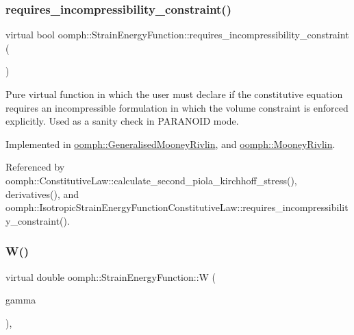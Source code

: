 \subsubsection{\texorpdfstring{requires\+\_\+incompressibility\+\_\+constraint()}{requires\_incompressibility\_constraint()}}
{\footnotesize\ttfamily virtual bool oomph\+::\+Strain\+Energy\+Function\+::requires\+\_\+incompressibility\+\_\+constraint (\begin{DoxyParamCaption}{ }\end{DoxyParamCaption})\hspace{0.3cm}{\ttfamily [pure virtual]}}



Pure virtual function in which the user must declare if the constitutive equation requires an incompressible formulation in which the volume constraint is enforced explicitly. Used as a sanity check in P\+A\+R\+A\+N\+O\+ID mode. 



Implemented in \hyperlink{classoomph_1_1GeneralisedMooneyRivlin_a2b41a132a90707ee2901787d398f45f8}{oomph\+::\+Generalised\+Mooney\+Rivlin}, and \hyperlink{classoomph_1_1MooneyRivlin_ad5cd489e1bc8f4cfe1f147135ffe21af}{oomph\+::\+Mooney\+Rivlin}.



Referenced by oomph\+::\+Constitutive\+Law\+::calculate\+\_\+second\+\_\+piola\+\_\+kirchhoff\+\_\+stress(), derivatives(), and oomph\+::\+Isotropic\+Strain\+Energy\+Function\+Constitutive\+Law\+::requires\+\_\+incompressibility\+\_\+constraint().

\mbox{\label{classoomph_1_1StrainEnergyFunction_a76cadaefaa89b93793c893f1302bd68a}} 
\subsubsection{\texorpdfstring{W()}{W()}\hspace{0.1cm}{\footnotesize\ttfamily [1/2]}}
{\footnotesize\ttfamily virtual double oomph\+::\+Strain\+Energy\+Function\+::W (\begin{DoxyParamCaption}\item[{const \hyperlink{classoomph_1_1DenseMatrix}{Dense\+Matrix}$<$ double $>$ \&}]{gamma }\end{DoxyParamCaption})\hspace{0.3cm}{\ttfamily [inline]}, {\ttfamily [virtual]}}



